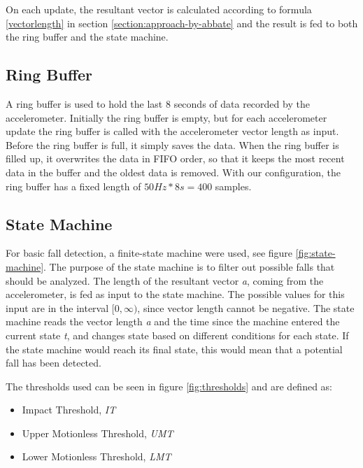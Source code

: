 \documentclass[12pt, a4paper, onecolumn]{article}
\begin{document}
	On each update, the resultant vector is calculated according to formula \ref{vectorlength} in section \ref{section:approach-by-abbate} and the result is fed to both the ring buffer and the state machine.
	
	\subsection{Ring Buffer}
	
	A ring buffer is used to hold the last 8 seconds of data recorded by the accelerometer. Initially the ring buffer is empty, but for each accelerometer update the ring buffer is called with the accelerometer vector length as input. Before the ring buffer is full, it simply saves the data. When the ring buffer is filled up, it overwrites the data in FIFO order, so that it keeps the most recent data in the buffer and the oldest data is removed. With our configuration, the ring buffer has a fixed length of \(50 Hz * 8 s = 400\) samples.
	
	\subsection{State Machine} \label{section:state-machine}
	
	For basic fall detection, a finite-state machine were used, see figure \ref{fig:state-machine}. The purpose of the state machine is to filter out possible falls that should be analyzed. The length of the resultant vector \textit{a}, coming from the accelerometer, is fed as input to the state machine. The possible values for this input are in the interval \( [0, \infty) \), since vector length cannot be negative. The state machine reads the vector length \textit{a} and the time since the machine entered the current state \textit{t}, and changes state based on different conditions for each state. If the state machine would reach its final state, this would mean that a potential fall has been detected.
	
	The thresholds used can be seen in figure \ref{fig:thresholds} and are defined as:
	
	\begin{itemize}
		\item Impact Threshold, \textit{IT}
		\item Upper Motionless Threshold, \textit{UMT}
		\item Lower Motionless Threshold, \textit{LMT}
	\end{itemize}
	
\end{document}
